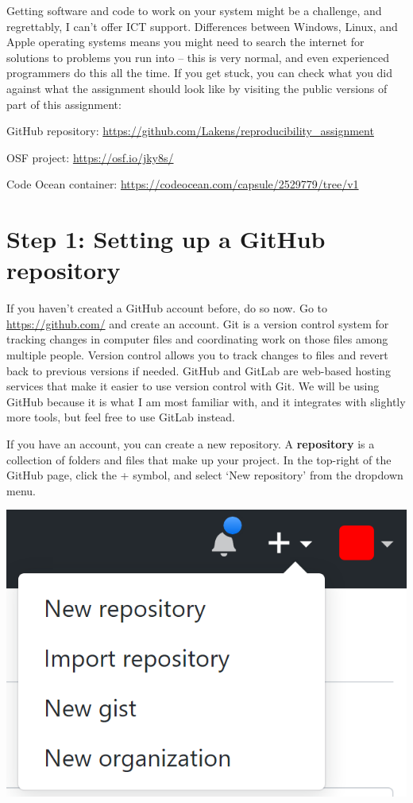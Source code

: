 \documentclass[
  oneside]{book}
\begin{document}
Getting software and code to work on your system might be a challenge, and
regrettably, I can't offer ICT support. Differences between Windows, Linux, and
Apple operating systems means you might need to search the internet for
solutions to problems you run into -- this is very normal, and even experienced
programmers do this all the time. If you get stuck, you can check what you did
against what the assignment should look like by visiting the public versions of
part of this assignment:

GitHub repository: \url{https://github.com/Lakens/reproducibility_assignment}

OSF project: \url{https://osf.io/jky8s/}

Code Ocean container: \url{https://codeocean.com/capsule/2529779/tree/v1}

\hypertarget{step-1-setting-up-a-github-repository}{%
\section{Step 1: Setting up a GitHub repository}\label{step-1-setting-up-a-github-repository}}

If you haven't created a GitHub account before, do so now. Go to
\url{https://github.com/} and create an account. Git is a version control system for
tracking changes in computer files and coordinating work on those files among
multiple people. Version control allows you to track changes to files and revert
back to previous versions if needed. GitHub and GitLab are web-based hosting
services that make it easier to use version control with Git. We will be using
GitHub because it is what I am most familiar with, and it integrates with
slightly more tools, but feel free to use GitLab instead.

If you have an account, you can create a new repository. A \textbf{repository} is a
collection of folders and files that make up your project. In the top-right of
the GitHub page, click the + symbol, and select `New repository' from the
dropdown menu.

\begin{center}\includegraphics[width=1\linewidth]{images/7a1725550cadb293b13fe058631a24ba} \end{center}
\end{document}
